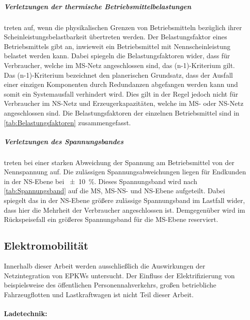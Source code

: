 \subparagraph{Verletzungen der thermische Betriebsmittelbelastungen} treten auf, wenn die physikalischen Grenzen von Betriebsmitteln bezüglich ihrer Scheinleistungsbelastbarkeit übertreten werden.
Der Belastungsfaktor eines Betriebsmittels gibt an, inwieweit ein Betriebsmittel mit Nennscheinleistung belastet werden kann.
Dabei spiegeln die Belastungsfaktoren wider, dass für Verbraucher, welche im \gls{MS}-Netz angeschlossen sind, das (n-1)-Kriterium  gilt.
Das (n-1)-Kriterium bezeichnet den planerischen Grundsatz, dass der Ausfall einer einzigen Komponenten durch Redundanzen abgefangen werden kann und somit ein Systemausfall verhindert wird.
Dies gilt in der Regel jedoch nicht für Verbraucher im \gls{NS}-Netz und Erzeugerkapazitäten, welche im \gls{MS}- oder \gls{NS}-Netz angeschlossen sind.
Die Belastungsfaktoren der einzelnen Betriebsmittel sind in \autoref{tab:Belastungsfaktoren} zusammengefasst. \cite{NKG} \cite{Rehtanz2017} \cite{Schachler}





\subparagraph{Verletzungen des Spannungsbandes} treten bei einer starken Abweichung der Spannung am Betriebsmittel von der Nennspannung auf.
Die zulässigen Spannungsabweichungen liegen für Endkunden in der \gls{NS}-Ebene bei \SI{\pm 10}{\percent}.
Dieses Spannungsband wird nach \autoref{tab:Spannungsband} auf die \gls{MS}, \gls{MS}-\gls{NS}- und \gls{NS}-Ebene aufgeteilt.
Dabei spiegelt das in der \gls{NS}-Ebene größere zulässige Spannungsband im Lastfall wider, dass hier die Mehrheit der Verbraucher angeschlossen ist.
Demgegenüber wird im Rückspeisefall ein größeres Spannungsband für die \gls{MS}-Ebene reserviert. \cite{Rehtanz2017} \cite{Schachler}




\subsection{Elektromobilität}

Innerhalb dieser Arbeit werden ausschließlich die Auswirkungen der Netzintegration von \glspl{EPKW} untersucht.
Der Einfluss der Elektrifizierung von beispielsweise des öffentlichen Personennahverkehrs, großen betriebliche Fahrzeugflotten und Lastkraftwagen ist nicht Teil dieser Arbeit.


\paragraph{Ladetechnik:}

